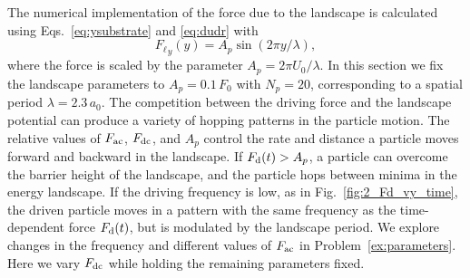 \documentclass[preprint,showpacs,preprintnumbers,amsmath,amssymb,aps,prb]{revtex4-1}
\theoremstyle{remark}
\begin{document}
\label{sec:results}
The numerical implementation of the force due to the landscape 
is calculated using Eqs.~\eqref{eq:ysubstrate} and \eqref{eq:dudr} with
\begin{equation}
  \label{eq:force}
  {F_{\ell}}_y(y) = A_{p} \sin{(2 \pi y / \lambda)},
\end{equation}
where the force is scaled by the parameter $A_{p} = 2\pi U_0/\lambda$.
In this section we fix the landscape parameters
to $A_{p} = 0.1\,F_0$ 
with $N_p=20$, 
corresponding to a spatial period $\lambda = 2.3\,a_0$.
The competition between the driving force and the landscape potential
can produce a variety of hopping patterns in the particle motion. 
The relative values of $F_{\rm ac}$, $F_{\rm dc}$, and $A_p$
control the rate and distance a  particle moves 
forward and backward in the landscape.
If $F_{\rm d}(t) > A_p$, a particle can 
overcome the barrier height of the landscape,
and 
the particle hops between minima in the energy landscape.
If the driving frequency is low,
as in Fig.~\ref{fig:2_Fd_vy_time},  
the driven particle 
moves 
in a pattern 
with the same frequency 
as the time-dependent force $F_{\rm d}(t)$,
but is modulated by the landscape period.
We explore changes in the frequency and different values of $F_{\rm ac}$ 
in Problem~\ref{ex:parameters}.
Here we vary $F_{\rm dc}$ 
while holding the remaining parameters fixed.
\end{document}
